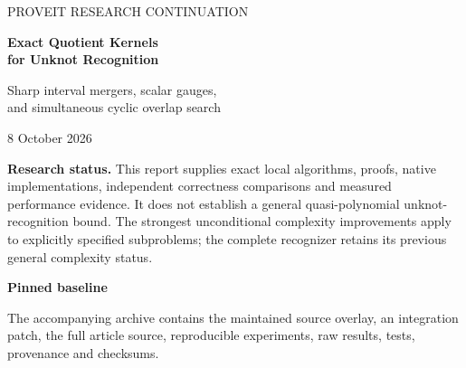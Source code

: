 \documentclass[11pt]{article}
\theoremstyle{definition}
\begin{document}
\begin{titlepage}
\color{ink}
\vspace*{13mm}
{\large\sffamily PROVEIT RESEARCH CONTINUATION\par}
\vspace{12mm}
{\huge\bfseries Exact Quotient Kernels\\[3mm]for Unknot Recognition\par}
\vspace{8mm}
{\Large Sharp interval mergers, scalar gauges,\\and simultaneous cyclic overlap search\par}
\vspace{12mm}
{\large 8 October 2026\par}
\vspace{12mm}
\noindent\begin{minipage}{0.94\textwidth}
\textbf{Research status.} This report supplies exact local algorithms, proofs,
native implementations, independent correctness comparisons and measured
performance evidence. It does not establish a general quasi-polynomial
unknot-recognition bound. The strongest unconditional complexity improvements
apply to explicitly specified subproblems; the complete recognizer retains
its previous general complexity status.
\end{minipage}
\vfill
\noindent\textbf{Pinned baseline}\par
\small{}\par
{}\par
{}\par
\vspace{5mm}
\noindent The accompanying archive contains the maintained source overlay,
an integration patch, the full article source, reproducible experiments,
raw results, tests, provenance and checksums.
\end{titlepage}
\end{document}
